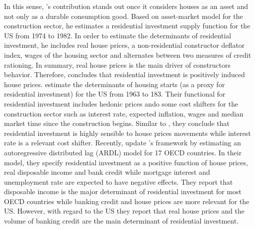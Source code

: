 \documentclass[12pt, a4paper]{article}
\begin{document}
In this sense, \citeauthor*{poterba_tax_1984}'s \citeyear{poterba_tax_1984} contribution stands out once it considers houses as an asset and not only as a durable consumption good.
Based on asset-market model for the construction sector, he estimates a residential investment supply function for the US from 1974 to 1982.
In order to estimate the determinants of residential investment, he includes real house prices, a non-residential constructor deflator index, wages of the housing sector and alternates between two measures  of  credit  rationing.
In summary, real house prices is the main driver of constructors behavior.
Therefore, \textcite{poterba_tax_1984} concludes that residential investment is positively induced house prices.
\textcite{topel_1988_Housing} estimate the determinants of housing starts (as a proxy for residential investment) for the US from 1963 to 183.
Their functional for residential investment includes hedonic prices ando some cost shifters for the construction sector such as interest rate, expected inflation, wages and median market time since the construction begins.
Similar to \textcite{poterba_tax_1984}, they conclude that residential investment is highly sensible to house prices movements while interest rate is a relevant cost shifter.
Recently,  \textcite{arestis_residential_2015} update \citeauthor*{poterba_tax_1984}'s \citeyear{poterba_tax_1984} framework by estimating an autoregressive distributed lag (ARDL) model for 17 OECD countries.
In their model, they specify residential investment as a positive function of house prices, real disposable income and bank credit while mortgage interest and unemployment rate are expected to have negative effects.
They report that disposable income is the major determinant of residential investment for most OECD countries while banking credit and house prices are more relevant for the US.
However, with regard to the US they report that real house prices and the volume of banking credit are the main determinant of residential investment.
\end{document}
